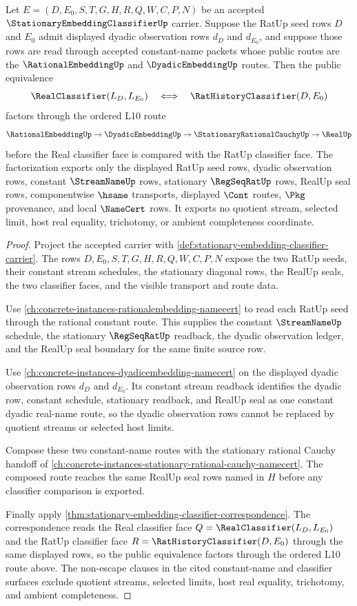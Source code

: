 \begin{theorem}
\label{thm:stationary-embedding-dyadic-rational-factorization}
Let $E=(D,E_0,S,T,G,H,R,Q,W,C,P,N)$ be an accepted $\StationaryEmbeddingClassifierUp$ carrier. Suppose the RatUp seed rows $D$ and $E_0$ admit displayed dyadic observation rows $d_D$ and $d_{E_0}$, and suppose those rows are read through accepted constant-name packets whose public routes are the $\RationalEmbeddingUp$ and $\DyadicEmbeddingUp$ routes. Then the public equivalence
$$
\RealClassifier(L_D,L_{E_0})
\quad\Longleftrightarrow\quad
\RatHistoryClassifier(D,E_0)
$$
factors through the ordered L10 route
$$
\RationalEmbeddingUp
\to
\DyadicEmbeddingUp
\to
\StationaryRationalCauchyUp
\to
\RealUp
$$
before the Real classifier face is compared with the RatUp classifier face. The factorization exports only the displayed RatUp seed rows, dyadic observation rows, constant $\StreamNameUp$ rows, stationary $\RegSeqRatUp$ rows, RealUp seal rows, componentwise $\hsame$ transports, displayed $\Cont$ routes, $\Pkg$ provenance, and local $\NameCert$ rows. It exports no quotient stream, selected limit, host real equality, trichotomy, or ambient completeness coordinate.
\end{theorem}
\begin{proof}
Project the accepted carrier with \autoref{def:stationary-embedding-classifier-carrier}. The rows $D,E_0,S,T,G,H,R,Q,W,C,P,N$ expose the two RatUp seeds, their constant stream schedules, the stationary diagonal rows, the RealUp seals, the two classifier faces, and the visible transport and route data.

Use \autoref{ch:concrete-instances-rationalembedding-namecert} to read each RatUp seed through the rational constant route. This supplies the constant $\StreamNameUp$ schedule, the stationary $\RegSeqRatUp$ readback, the dyadic observation ledger, and the RealUp seal boundary for the same finite source row.

Use \autoref{ch:concrete-instances-dyadicembedding-namecert} on the displayed dyadic observation rows $d_D$ and $d_{E_0}$. Its constant stream readback identifies the dyadic row, constant schedule, stationary readback, and RealUp seal as one constant dyadic real-name route, so the dyadic observation rows cannot be replaced by quotient streams or selected host limits.

Compose these two constant-name routes with the stationary rational Cauchy handoff of \autoref{ch:concrete-instances-stationary-rational-cauchy-namecert}. The composed route reaches the same RealUp seal rows named in $H$ before any classifier comparison is exported.

Finally apply \autoref{thm:stationary-embedding-classifier-correspondence}. The correspondence reads the Real classifier face $Q=\RealClassifier(L_D,L_{E_0})$ and the RatUp classifier face $R=\RatHistoryClassifier(D,E_0)$ through the same displayed rows, so the public equivalence factors through the ordered L10 route above. The non-escape clauses in the cited constant-name and classifier surfaces exclude quotient streams, selected limits, host real equality, trichotomy, and ambient completeness.
\end{proof}

